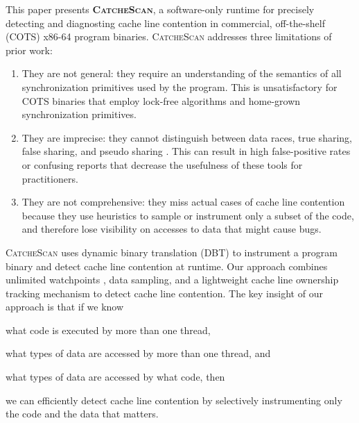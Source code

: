 \documentclass{sig-alternate}
\newcommand{\TextToolname}{CatcheScan}
\newcommand{\Toolname}{\textsc{\TextToolname{}}}
\newcommand{\BoldToolname}{\textsc{\bf\TextToolname{}}}
\begin{document}
This paper presents \BoldToolname{}, a software-only runtime for precisely detecting and diagnosting cache line
contention in commercial, off-the-shelf (COTS) x86-64 program binaries. \Toolname{} addresses three limitations of prior
work: \begin{enumerate}
\item They are not general: they require an understanding of the semantics of all synchronization primitives used
by the program. This is unsatisfactory for COTS binaries that employ lock-free algorithms and home-grown synchronization
primitives.

\item They are imprecise: they cannot distinguish between data races, true sharing, false sharing, and pseudo sharing
\cite{DegenerateSharingAndFalseCoherence}. This can result in high false-positive rates or confusing reports that decrease
the usefulness of these tools for practitioners.

\item They are not comprehensive: they miss actual cases of cache line contention because they use heuristics to sample 
or instrument only a subset of the code, and therefore lose visibility on accesses to data that might cause bugs.




\end{enumerate}

\Toolname{} uses dynamic binary translation (DBT) to instrument a program binary and detect cache line contention
at runtime. Our approach combines unlimited watchpoints \cite{UnlimitedWatchpoints,DynamoRIOWatchpoints}, data
sampling, and a lightweight cache line ownership tracking mechanism to detect cache line contention. The key insight
of our approach is that if we know \begin{inparaenum}[i)]
\item what code is executed by more than one thread,
\item what types of data are accessed by more than one thread, and
\item what types of data are accessed by what code, then
\end{inparaenum}
we can efficiently detect cache line contention by selectively instrumenting only the code and the data that matters.
\end{document}
